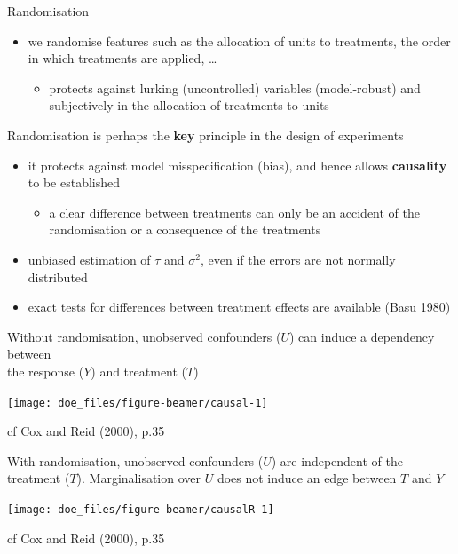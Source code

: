 \documentclass[
  ignorenonframetext,
]{beamer}
\providecommand{\tightlist}{%
  \setlength{\itemsep}{0pt}\setlength{\parskip}{0pt}}
\begin{document}
\begin{frame}{}
\protect\hypertarget{section-4}{}
Randomisation

\begin{itemize}
\tightlist
\item
  we randomise features such as the allocation of units to treatments,
  the order in which treatments are applied, \ldots{}

  \begin{itemize}
  \tightlist
  \item
    protects against lurking (uncontrolled) variables (model-robust) and
    subjectively in the allocation of treatments to units
  \end{itemize}
\end{itemize}

Randomisation is perhaps the \textbf{key} principle in the design of
experiments

\begin{itemize}
\tightlist
\item
  it protects against model misspecification (bias), and hence allows
  \textbf{causality} to be established

  \begin{itemize}
  \tightlist
  \item
    a clear difference between treatments can only be an accident of the
    randomisation or a consequence of the treatments
  \end{itemize}
\item
  unbiased estimation of \(\tau\) and \(\sigma^2\), even if the errors
  are not normally distributed
\item
  exact tests for differences between treatment effects are available
  (Basu 1980)
\end{itemize}
\end{frame}

\begin{frame}{}
\protect\hypertarget{section-5}{}
Without randomisation, unobserved confounders (\(U\)) can induce a
dependency between\\
the response (\(Y\)) and treatment (\(T\))

\begin{center}\texttt{[image: doe\_files/figure-beamer/causal-1]} \end{center}

cf Cox and Reid (2000), p.35
\end{frame}

\begin{frame}{}
\protect\hypertarget{section-6}{}
With randomisation, unobserved confounders (\(U\)) are independent of
the treatment (\(T\)). Marginalisation over \(U\) does not induce an
edge between \(T\) and \(Y\)

\begin{center}\texttt{[image: doe\_files/figure-beamer/causalR-1]} \end{center}

cf Cox and Reid (2000), p.35
\end{frame}
\end{document}
